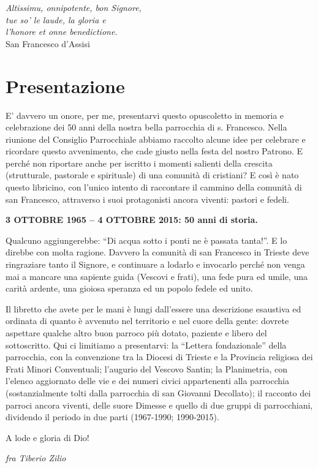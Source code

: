 \thispagestyle{empty}
\vspace*{15ex}
\begin{flushright}
\textit{Altissimu, onnipotente, bon Signore,\\
tue so’ le laude, la gloria e \\
l’honore et onne benedictione.\\}
\vspace{2ex}
\scriptsize{San Francesco d'Assisi}
\end{flushright}
\cleardoublepage

\chapter*{Presentazione}
\label{chap:abstract}
E’ davvero un onore, per me, presentarvi questo opuscoletto in memoria e celebrazione dei
50 anni della nostra bella parrocchia di s. Francesco. Nella riunione del Consiglio Parrocchiale 
abbiamo raccolto alcune idee per celebrare e ricordare questo avvenimento, che cade giusto nella 
festa del nostro Patrono. E perché non riportare anche per iscritto i momenti salienti della crescita 
(strutturale, pastorale e spirituale) di una comunità di cristiani? E così è nato questo libricino, con 
l’unico intento di raccontare il cammino della comunità di san Francesco, attraverso i suoi 
protagonisti ancora viventi: pastori e fedeli.
\begin{center}
	\textbf{3 OTTOBRE 1965 – 4 OTTOBRE 2015: 50 anni di storia.}
\end{center}

Qualcuno aggiungerebbe: “Di acqua sotto i ponti ne è passata tanta!”. E lo direbbe con molta 
ragione. Davvero la comunità di san Francesco in Trieste deve ringraziare tanto il Signore, e 
continuare a lodarlo e invocarlo perché non venga mai a mancare una sapiente guida (Vescovi e 
frati), una fede pura ed umile, una carità ardente, una gioiosa speranza ed un popolo fedele ed unito. 
\bigbreak

Il libretto che avete per le mani è lungi dall’essere una descrizione esaustiva ed ordinata di 
quanto è avvenuto nel territorio e nel cuore della gente: dovrete aspettare qualche altro buon 
parroco più dotato, paziente e libero del sottoscritto.
Qui ci limitiamo a presentarvi: la “Lettera fondazionale” della parrocchia, con la convenzione tra la 
Diocesi di Trieste e la Provincia religiosa dei Frati Minori Conventuali; l’augurio del Vescovo 
Santin; la Planimetria, con l’elenco aggiornato delle vie e dei numeri civici appartenenti alla 
parrocchia (sostanzialmente tolti dalla parrocchia di san Giovanni Decollato); il racconto dei parroci  
ancora viventi, delle suore Dimesse e quello di due gruppi di parrocchiani, dividendo il periodo in 
due parti (1967-1990; 1990-2015).
 
A lode e gloria di Dio!
\begin{flushright}
	\textit{fra Tiberio Zilio}
\end{flushright}